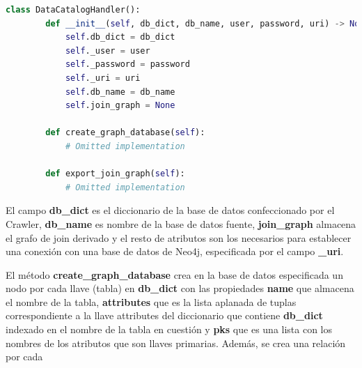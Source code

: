 \begin{lstlisting}[label={code:catalog}, caption={Clase DataCatalogHandler}, language={python}]
    class DataCatalogHandler():
        def __init__(self, db_dict, db_name, user, password, uri) -> None:
            self.db_dict = db_dict
            self._user = user
            self._password = password
            self._uri = uri
            self.db_name = db_name
            self.join_graph = None

        def create_graph_database(self):
            # Omitted implementation

        def export_join_graph(self):
            # Omitted implementation

\end{lstlisting}

El campo \textbf{db\_dict} es el diccionario de la base de datos confeccionado por el Crawler, \textbf{db\_name} es 
nombre de la base de datos fuente, \textbf{join\_graph} almacena el grafo de join derivado y el resto de atributos 
son los necesarios para establecer una conexi\'on con una base de datos de Neo4j, especificada por el campo \textbf{\_uri}. 

El m\'etodo \textbf{create\_graph\_database} crea en la base de datos especificada un nodo por cada llave (tabla) 
en \textbf{db\_dict} con las propiedades \textbf{name} que almacena el nombre de la tabla, \textbf{attributes} que 
es la lista aplanada de tuplas correspondiente a la llave attributes del diccionario que contiene \textbf{db\_dict} 
indexado en el nombre de la tabla en cuesti\'on y \textbf{pks} que es una lista con los nombres de los atributos que 
son llaves primarias. Adem\'as, se crea una relación por cada  